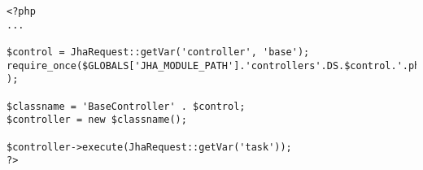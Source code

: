 \begin{lstlisting}[label=jha_mod_base,caption=Punto de entrada al m\'odulo.]
<?php
...

$control = JhaRequest::getVar('controller', 'base');
require_once($GLOBALS['JHA_MODULE_PATH'].'controllers'.DS.$control.'.php' );

$classname = 'BaseController' . $control;
$controller = new $classname();

$controller->execute(JhaRequest::getVar('task'));
?>
\end{lstlisting}
